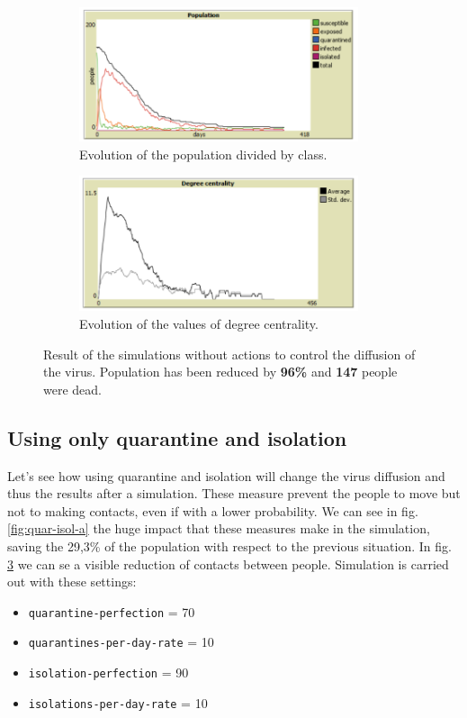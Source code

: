 \documentclass[12pt]{llncs}
\begin{document}
\begin{figure}
	\begin{subfigure}{\textwidth}
	\centering
		\includegraphics[width=0.9\textwidth]{results/no_actions_population.png}
		\caption{Evolution of the population divided by class.} \label{fig:noactions-a}
	\end{subfigure}
	\begin{subfigure}{\textwidth}
	\centering
		\includegraphics[width=0.9\textwidth]{results/no_actions_degree_centrality.png}
		\caption{Evolution of the values of degree centrality.} \label{fig:noactions-b}
	\end{subfigure}
	\caption{Result of the simulations without actions to control the diffusion of the virus. Population has been reduced by \textbf{96\%} and \textbf{147} people were dead.}
\end{figure}

\subsection{Using only quarantine and isolation}
Let's see how using quarantine and isolation will change the virus diffusion and thus the results after a simulation. These measure prevent the people to move but not to making contacts, even if with a lower probability. We can see in fig. \ref{fig:quar-isol-a} the huge impact that these measures make in the simulation, saving the 29,3\% of the population with respect to the previous situation. In fig. \ref{fig:noactions-b} we can se a visible reduction of contacts between people. Simulation is carried out with these settings:
\begin{itemize}
\item \texttt{quarantine-perfection} = 70
\item \texttt{quarantines-per-day-rate} = 10
\item \texttt{isolation-perfection} = 90
\item \texttt{isolations-per-day-rate} = 10
\end{itemize}
\end{document}
